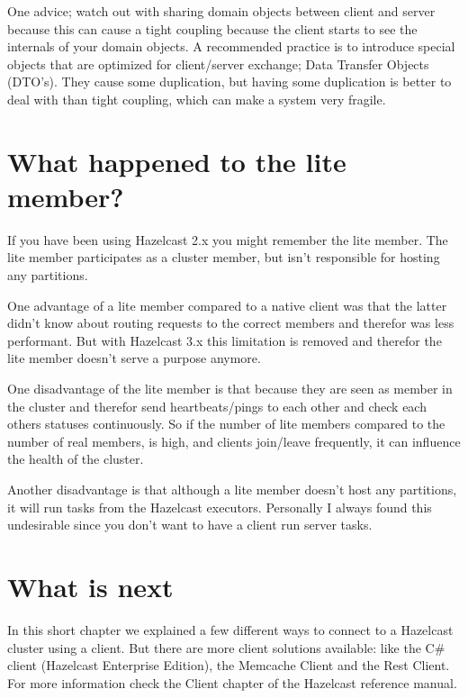 One advice; watch out with sharing domain objects between client and server because this can cause a tight coupling because the client starts to see the internals of your domain objects. A recommended practice is to introduce special objects that are optimized for client/server exchange; Data Transfer Objects (DTO's). They cause some duplication, but having some duplication is better to deal with than tight coupling, which can make a system very fragile.

\section{What happened to the lite member?}
If you have been using Hazelcast 2.x you might remember the lite member. The lite member participates as a cluster member, but isn't responsible for hosting any partitions. 

One advantage of a lite member compared to a native client was that the latter didn't know about routing requests to the correct members and therefor was less performant. But with Hazelcast 3.x this limitation is removed and therefor the lite member doesn't serve a purpose anymore.

One disadvantage of the lite member is that because they are seen as member in the cluster and therefor send heartbeats/pings to each other and check each others statuses continuously. So if the number of lite members compared to the number of real members, is high, and clients join/leave frequently, it can influence the health of the cluster. 

Another disadvantage is that although a lite member doesn't host any partitions, it will run tasks from the Hazelcast executors. Personally I always found this undesirable since you don't want to have a client run server tasks.

\section{What is next}
In this short chapter we explained a few different ways to connect to a Hazelcast cluster using a client. But there are more client solutions available: like the C\# client (Hazelcast Enterprise Edition), the Memcache Client and the Rest Client. For more information check the Client chapter of the Hazelcast reference manual.
